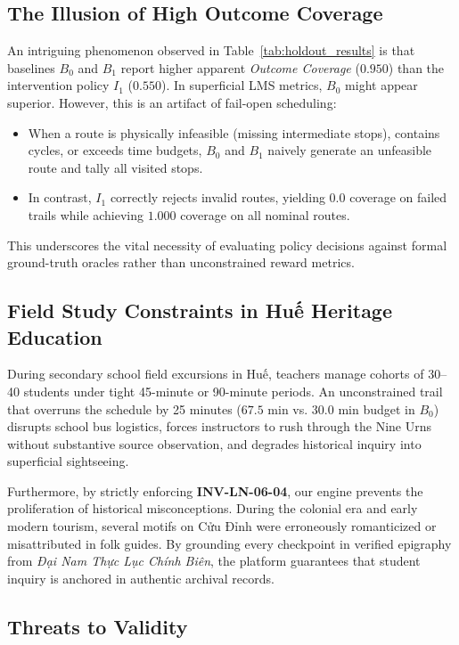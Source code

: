 \documentclass[11pt,a4paper]{article}
\begin{document}
\subsection{The Illusion of High Outcome Coverage}
An intriguing phenomenon observed in Table~\ref{tab:holdout_results} is that baselines $B_0$ and $B_1$ report higher apparent \textit{Outcome Coverage} ($0.950$) than the intervention policy $I_1$ ($0.550$). In superficial LMS metrics, $B_0$ might appear superior. However, this is an artifact of fail-open scheduling:
\begin{itemize}
    \item When a route is physically infeasible (missing intermediate stops), contains cycles, or exceeds time budgets, $B_0$ and $B_1$ naively generate an unfeasible route and tally all visited stops.
    \item In contrast, $I_1$ correctly rejects invalid routes, yielding $0.0$ coverage on failed trails while achieving $1.000$ coverage on all nominal routes.
\end{itemize}
This underscores the vital necessity of evaluating policy decisions against formal ground-truth oracles rather than unconstrained reward metrics.

\subsection{Field Study Constraints in Huế Heritage Education}
During secondary school field excursions in Huế, teachers manage cohorts of 30--40 students under tight 45-minute or 90-minute periods. An unconstrained trail that overruns the schedule by 25 minutes ($67.5$ min vs. $30.0$ min budget in $B_0$) disrupts school bus logistics, forces instructors to rush through the Nine Urns without substantive source observation, and degrades historical inquiry into superficial sightseeing. 

Furthermore, by strictly enforcing \textbf{INV-LN-06-04}, our engine prevents the proliferation of historical misconceptions. During the colonial era and early modern tourism, several motifs on Cửu Đỉnh were erroneously romanticized or misattributed in folk guides. By grounding every checkpoint in verified epigraphy from \textit{Đại Nam Thực Lục Chính Biên}, the platform guarantees that student inquiry is anchored in authentic archival records.

\subsection{Threats to Validity}
\end{document}
